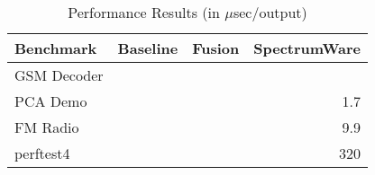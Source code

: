 



\begin{table}[t]
\begin{center}
\scriptsize
\begin{tabular}{|l|r|r|r|} \hline
Benchmark       & Baseline & Fusion & SpectrumWare \\
\hline \hline
GSM Decoder      & & & \\
\hline
PCA Demo &  &  & 1.7\\
\hline
FM Radio &  &  & 9.9\\
\hline
perftest4 &  &  & 320\\
\hline
\end{tabular}
\vspace{-6pt}
\caption{\protect\small Performance Results (in $\mu$sec/output)}
\label{tab:benchmarks}
\end{center}
\end{table}